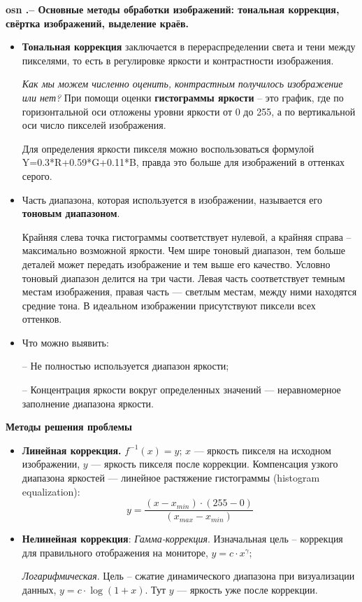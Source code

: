 \textbf{\LARGE osn .-- Основные методы обработки изображений: тональная коррекция, свёртка изображений, выделение краёв.}


\begin{itemize}
\item \textbf{Тональная коррекция} заключается в перераспределении света и тени между пикселями, то есть в регулировке яркости и контрастности изображения. 

\textit{ Как мы можем численно оценить, контрастным получилось изображение или нет?} При помощи оценки \textbf{гистограммы яркости} -- это график, где по горизонтальной оси отложены уровни яркости от 0 до 255, а по вертикальной оси число пикселей изображения.

Для определения яркости пикселя можно воспользоваться формулой Y=0.3*R+0.59*G+0.11*B, правда это больше для изображений в оттенках серого.


\item Часть диапазона, которая используется в изображении, называется его \textbf{тоновым диапазоном}. 

Крайняя слева точка гистограммы соответствует нулевой, а крайняя справа -- максимально возможной яркости. Чем шире тоновый диапазон, тем больше деталей может передать изображение и тем выше его качество. Условно тоновый диапазон делится на три части. Левая часть соответствует темным местам изображения, правая часть --- светлым местам, между ними находятся средние тона. В идеальном изображении присутствуют пиксели всех оттенков.
\item Что можно выявить:
    \item[--] Не полностью используется диапазон яркости;
    \item[--] Концентрация яркости вокруг определенных значений --- неравномерное заполнение диапазона яркости.
\end{itemize}



\textbf{Методы решения проблемы}
\begin{itemize}
\item \textbf{Линейная коррекция.} 
$f^{-1}(x) = y$; $x$ --- яркость пикселя на исходном изображении, $y$ --- яркость пикселя после коррекции. Компенсация узкого диапазона яркостей --- линейное растяжение гистограммы (histogram equalization):
$$y = \frac{(x-x_{min})\cdot(255-0)}{(x_{max} - x_{min})}$$

\item \textbf{Нелинейная коррекция}:\newline
\textit{Гамма-коррекция}. Изначальная цель -- коррекция для правильного отображения на мониторе, $y = c \cdot x^\gamma$;

\textit{Логарифмическая}. Цель -- сжатие динамического диапазона при визуализации данных, $y = c \cdot \log(1 + x)$. Тут $y$ --- яркость уже после коррекции.
\end{itemize}


